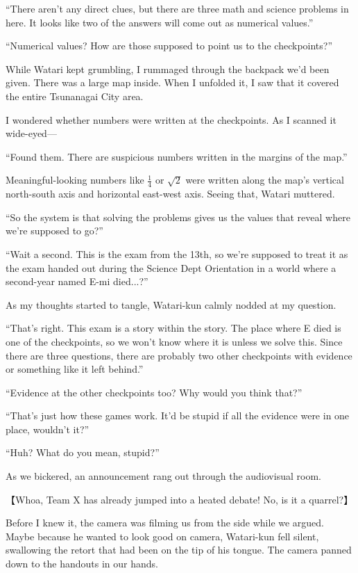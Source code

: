 \documentclass[
    a4paper,
    12pt,
    twoside,
    openany,
    UTF8,
    fontset=windows
]{ctexbook}
\begin{document}
``There aren't any direct clues, but there are three math and science problems in here. It looks like two of the answers will come out as numerical values.''

``Numerical values? How are those supposed to point us to the checkpoints?''

While Watari kept grumbling, I rummaged through the backpack we'd been given. There was a large map inside. When I unfolded it, I saw that it covered the entire Tsunanagai City area.

I wondered whether numbers were written at the checkpoints. As I scanned it wide-eyed---

``Found them. There are suspicious numbers written in the margins of the map.''

Meaningful-looking numbers like $\frac{1}{4}$ or $\sqrt{2}$ were written along the map's vertical north-south axis and horizontal east-west axis. Seeing that, Watari muttered.

``So the system is that solving the problems gives us the values that reveal where we're supposed to go?''

``Wait a second. This is the exam from the 13th, so we're supposed to treat it as the exam handed out during the Science Dept Orientation in a world where a second-year named E-mi died...?''

As my thoughts started to tangle, Watari-kun calmly nodded at my question.

``That's right. This exam is a story within the story. The place where E died is one of the checkpoints, so we won't know where it is unless we solve this. Since there are three questions, there are probably two other checkpoints with evidence or something like it left behind.''

``Evidence at the other checkpoints too? Why would you think that?''

``That's just how these games work. It'd be stupid if all the evidence were in one place, wouldn't it?''

``Huh? What do you mean, stupid?''

As we bickered, an announcement rang out through the audiovisual room.

【Whoa, Team X has already jumped into a heated debate! No, is it a quarrel?】

Before I knew it, the camera was filming us from the side while we argued. Maybe because he wanted to look good on camera, Watari-kun fell silent, swallowing the retort that had been on the tip of his tongue. The camera panned down to the handouts in our hands.
\end{document}

